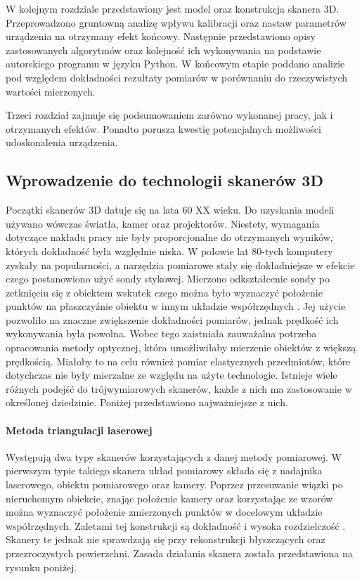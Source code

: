 \documentclass[10pt]{article}
\begin{document}
W kolejnym rozdziale przedstawiony jest model oraz konstrukcja skanera 3D. Przeprowadzono gruntowną analizę wpływu kalibracji oraz nastaw parametrów urządzenia na otrzymany efekt końcowy. Następnie przedstawiono opisy zastosowanych algorytmów oraz kolejność ich wykonywania na podstawie autorskiego programu w języku Python. W końcowym etapie poddano analizie pod względem dokładności rezultaty pomiarów w porównaniu do rzeczywistych wartości mierzonych.

Trzeci rozdział zajmuje się podsumowaniem zarówno wykonanej pracy, jak i otrzymanych efektów. Ponadto porusza kwestię potencjalnych możliwości udoskonalenia urządzenia.

\subsection{Wprowadzenie do technologii skanerów 3D}

Początki skanerów 3D datuje się na lata 60 XX wieku. Do uzyskania modeli używano wówczas światła, kamer oraz projektorów. Niestety, wymagania dotyczące nakładu pracy nie były proporcjonalne do otrzymanych wyników, których dokładność była względnie niska. W połowie lat 80-tych komputery zyskały na popularności, a narzędzia pomiarowe stały się dokładniejsze w efekcie czego postanowiono użyć sondy stykowej. Mierzono odkształcenie sondy po zetknięciu się z obiektem wskutek czego można było wyznaczyć położenie punktów na płaszczyźnie obiektu w innym układzie współrzędnych \cite{abdel20113d}. Jej użycie pozwoliło na znaczne zwiększenie dokładności pomiarów, jednak prędkość ich wykonywania była powolna. Wobec tego zaistniała zauważalna potrzeba opracowania metody optycznej, która umożliwiłaby mierzenie obiektów z większą prędkością. Miałoby to na celu również pomiar elastycznych przedmiotów, które dotychczas nie były mierzalne ze względu na użyte technologie. Istnieje wiele różnych podejść do trójwymiarowych skanerów, każde z nich ma zastosowanie w określonej dziedzinie. Poniżej przedstawiono najważniejsze z nich.

\paragraph{Metoda triangulacji laserowej\newline}
Występują dwa typy skanerów korzystających z danej metody pomiarowej. W pierwszym typie takiego skanera układ pomiarowy składa się z nadajnika laserowego, obiektu pomiarowego oraz kamery. Poprzez przesuwanie wiązki po nieruchomym obiekcie, znając położenie kamery oraz korzystając ze wzorów \cite{mikulski2013metody} można wyznaczyć położenie zmierzonych punktów w docelowym układzie współrzędnych. Zaletami tej konstrukcji są dokładność i wysoka rozdzielczość \cite{nowacki2018pomiar}. Skanery te jednak nie sprawdzają się przy rekonstrukcji błyszczących oraz przezroczystych powierzchni. Zasada działania skanera została przedstawiona na rysunku poniżej.
\end{document}
